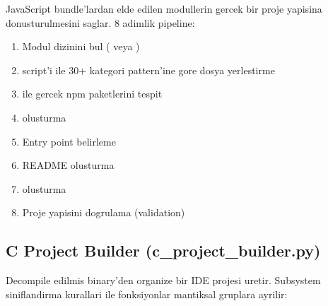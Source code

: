 JavaScript bundle'lardan elde edilen modullerin gercek bir proje yapisina
donusturulmesini saglar. 8 adimlik pipeline:

\begin{enumerate}
  \item Modul dizinini bul ( veya )
  \item {} script'i ile 30+ kategori pattern'ine
        gore dosya yerlestirme
  \item {} ile gercek npm paketlerini tespit
  \item {} olusturma
  \item Entry point belirleme
  \item README olusturma
  \item {} olusturma
  \item Proje yapisini dogrulama (validation)
\end{enumerate}

\subsection{C Project Builder (c\_project\_builder.py)}

Decompile edilmis binary'den organize bir IDE projesi uretir. Subsystem
siniflandirma kurallari ile fonksiyonlar mantiksal gruplara ayrilir:

